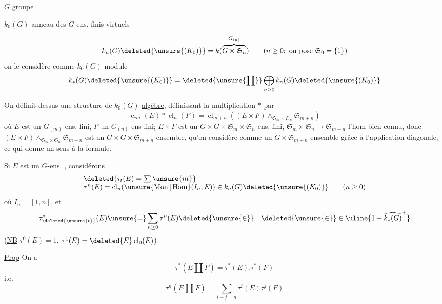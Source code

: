 $G$ groupe

$k_0(G)$ anneau des $G$-ens. finis virtuels

\[
k_n(G)\deleted{\unsure{(K_0)}}=k(\overbrace{G\times\mathfrak S_n}^{G_{(n)}})
\qquad(n\geq0;\ \text{on pose }\mathfrak S_0=\{1\})
\]
on le considère comme $k_0(G)$-module
\[
k_*(G)\deleted{\unsure{(K_0)}}=\deleted{\unsure{\prod}}\bigoplus_{n\geq0}k_n(G)\deleted{\unsure{(K_0)}}
\]

On définit dessus une structure de $k_0(G)$-\uline{algèbre},
 définissant la multiplication $*$ par
\[
\operatorname{cl}_m(E)*\operatorname{cl}_n(F)=\operatorname{cl}_{m+n}((E\times F)\mathbin{\wedge}_{\mathfrak S_m\times\mathfrak S_n}\mathfrak S_{m+n})
\]
où $E$ est un $G_{(m)}$ ens. fini, $F$ un $G_{(n)}$ ens fini;
$E\times F$ est un $G\times G\times\mathfrak S_m\times\mathfrak S_n$ ens. fini,
$\mathfrak S_m\times\mathfrak S_n\longrightarrow\mathfrak S_{m+n}$ l'hom bien connu,
donc $(E\times F)\mathbin{\wedge}_{\mathfrak S_m\times\mathfrak S_n}\mathfrak S_{m+n}$ est un $G\times G\times\mathfrak S_{m+n}$
ensemble, qu'on considère comme un $G\times\mathfrak S_{m+n}$
ensemble grâce à l'application diagonale, ce qui
donne un sens à la formule.

Si $E$ est un $G$-ens. , considérons
\[
\begin{array}{l}\deleted{\tau_t(E)=\sum\unsure{nt}}\\
\tau^n(E)=\operatorname{cl}_n(\unsure{\operatorname{Mon}|\operatorname{Hom}}(I_n,E))\in k_n(G)\deleted{\unsure{(K_0)}}\qquad(n\geq0)\end{array}
\]
où $I_n=[1,n]$, et
\[
\tau^*_{\deleted{\unsure{t}}}(E)\unsure{=}\sum_{n\geq0}\tau^n(E)\deleted{\unsure{\in}}\quad\deleted{\unsure{\in}}\in\uline{1+\widehat{k_*(G)}^+}
\]
(\uline{NB} $\tau^0(E)=1$, $\tau^1(E)=\deleted{E}\operatorname{cl}_0(E)$)

\uline{Prop} On a
\[
\tau^*(E\amalg F)=\tau^*(E).\tau^*(F)
\]
i.e.
\[
\tau^n(E\amalg F)=\sum_{i+j=n}\tau^i(E)\tau^j(F)
\]
